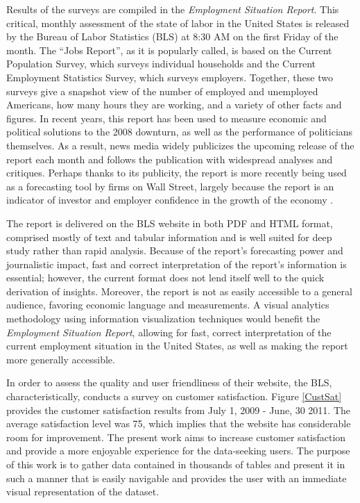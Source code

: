 \documentclass[11pt,letterpaper]{article}
\begin{document}
Results of the surveys are compiled in the \textit{Employment Situation Report}. This critical, monthly assessment of the state of labor in the United States is released by the Bureau of Labor Statistics (BLS) at 8:30 AM on the first Friday of the month. The ``Jobs Report'', as it is popularly called, is based on the Current Population Survey, which surveys individual households and the Current Employment Statistics Survey, which surveys employers. Together, these two surveys give a snapshot view of the number of employed and unemployed Americans, how many hours they are working, and a variety of other facts and figures. In recent years, this report has been used to measure economic and political solutions to the 2008 downturn, as well as the performance of politicians themselves. As a result, news media widely publicizes the upcoming release of the report each month and follows the publication with widespread analyses and critiques. Perhaps thanks to its publicity, the report is more recently being used as a forecasting tool by firms on Wall Street, largely because the report is an indicator of investor and employer confidence in the growth of the economy \cite{mahorney_what_2013}.

The report is delivered on the BLS website in both PDF and HTML format, comprised mostly of text and tabular information and is well suited for deep study rather than rapid analysis. Because of the report's forecasting power and journalistic impact, fast and correct interpretation of the report's information is essential; however, the current format does not lend itself well to the quick derivation of insights. Moreover, the report is not as easily accessible to a general audience, favoring economic language and measurements. A visual analytics methodology \cite{keim_mastering_2010} using information visualization techniques would benefit the \textit{Employment Situation Report}, allowing for fast, correct interpretation of the current employment situation in the United States, as well as making the report more generally accessible.

In order to assess the quality and user friendliness of their website, the BLS, characteristically, conducts a survey on customer satisfaction. Figure \ref{CustSat} provides the customer satisfaction results from July 1, 2009 - June, 30 2011. The average satisfaction level was 75, which implies that the website has considerable room for improvement. The present work aims to increase customer satisfaction and provide a more enjoyable experience for the data-seeking users. The purpose of this work is to gather data contained in thousands of tables and present it in such a manner that is easily navigable and provides the user with an immediate visual representation of the dataset.
\end{document}
